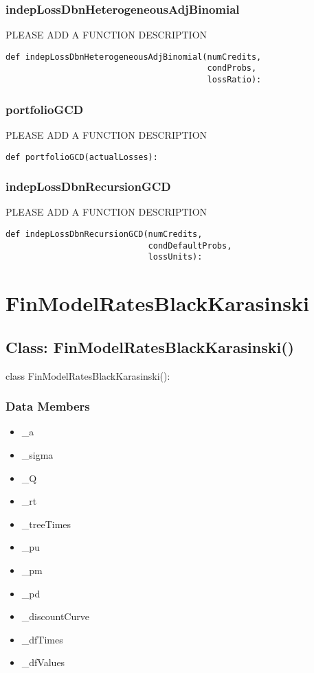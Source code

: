 \documentclass[twoside,11pt]{book}
\begin{document}
\subsubsection*{{\bf indepLossDbnHeterogeneousAdjBinomial}}
PLEASE ADD A FUNCTION DESCRIPTION

\begin{lstlisting}
def indepLossDbnHeterogeneousAdjBinomial(numCredits,
                                         condProbs,
                                         lossRatio):
\end{lstlisting}

\subsubsection*{{\bf portfolioGCD}}
PLEASE ADD A FUNCTION DESCRIPTION

\begin{lstlisting}
def portfolioGCD(actualLosses):
\end{lstlisting}

\subsubsection*{{\bf indepLossDbnRecursionGCD}}
PLEASE ADD A FUNCTION DESCRIPTION

\begin{lstlisting}
def indepLossDbnRecursionGCD(numCredits,
                             condDefaultProbs,
                             lossUnits):
\end{lstlisting}

\newpage
\section{FinModelRatesBlackKarasinski}

\subsection*{Class: FinModelRatesBlackKarasinski()}
class FinModelRatesBlackKarasinski(): 

\subsubsection*{Data Members}
\begin{itemize}
\item{\_a}
\item{\_sigma}
\item{\_Q}
\item{\_rt}
\item{\_treeTimes}
\item{\_pu}
\item{\_pm}
\item{\_pd}
\item{\_discountCurve}
\item{\_dfTimes}
\item{\_dfValues}
\end{itemize}
\end{document}

